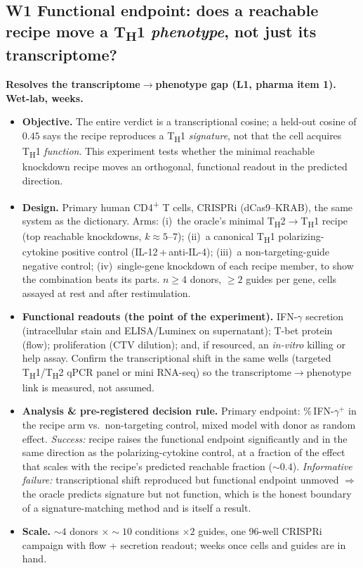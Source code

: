 \documentclass[11pt]{article}
\newcommand{\Th}[1]{T\textsubscript{H}#1}
\newcommand{\sev}[2]{\textcolor{#1}{\textbf{#2}}}
\begin{document}
\subsection{W1 \quad Functional endpoint: does a reachable recipe move a T\textsubscript{H}1 \emph{phenotype}, not just its transcriptome?}
\sev{sev1}{Resolves the transcriptome$\rightarrow$phenotype gap (L1, pharma item 1). Wet-lab, weeks.}
\begin{itemize}
\item[] \textbf{Objective.} The entire verdict is a transcriptional cosine; a held-out cosine of
$0.45$ says the recipe reproduces a \Th{1} \emph{signature}, not that the cell acquires \Th{1}
\emph{function}. This experiment tests whether the minimal reachable knockdown recipe moves an
orthogonal, functional readout in the predicted direction.
\item[] \textbf{Design.} Primary human CD4\textsuperscript{+} T cells, CRISPRi (dCas9--KRAB), the
same system as the dictionary. Arms: (i)~the oracle's minimal \Th{2}$\rightarrow$\Th{1} recipe
(top reachable knockdowns, $k\!\approx\!5$--$7$); (ii)~a canonical \Th{1} polarizing-cytokine
positive control (IL-12\,+\,anti-IL-4); (iii)~a non-targeting-guide negative control; (iv)~single-gene
knockdown of each recipe member, to show the combination beats its parts. $n\!\ge\!4$ donors,
$\ge\!2$ guides per gene, cells assayed at rest and after restimulation.
\item[] \textbf{Functional readouts (the point of the experiment).} IFN-$\gamma$ secretion
(intracellular stain and ELISA/Luminex on supernatant); T-bet protein (flow); proliferation
(CTV dilution); and, if resourced, an \emph{in-vitro} killing or help assay. Confirm the
transcriptional shift in the same wells (targeted \Th{1}/\Th{2} qPCR panel or mini
RNA-seq) so the transcriptome$\rightarrow$phenotype link is measured, not assumed.
\item[] \textbf{Analysis \& pre-registered decision rule.} Primary endpoint: \%\,IFN-$\gamma^{+}$
in the recipe arm vs.\ non-targeting control, mixed model with donor as random effect.
\emph{Success:} recipe raises the functional endpoint significantly and in the same direction as
the polarizing-cytokine control, at a fraction of the effect that scales with the recipe's
predicted reachable fraction ($\sim\!0.4$). \emph{Informative failure:} transcriptional shift
reproduced but functional endpoint unmoved $\Rightarrow$ the oracle predicts signature but not
function, which is the honest boundary of a signature-matching method and is itself a result.
\item[] \textbf{Scale.} $\sim\!4$ donors $\times\!\sim\!10$ conditions $\times\!2$ guides,
one 96-well CRISPRi campaign with flow + secretion readout; weeks once cells and guides are in hand.
\end{itemize}
\end{document}
